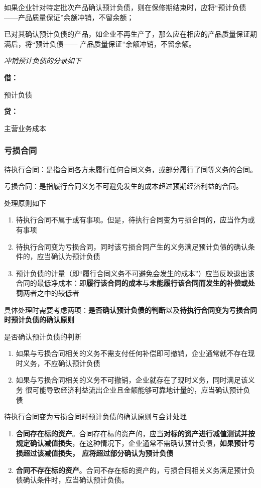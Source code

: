 \documentclass[UTF8,12pt]{ctexart}
\newenvironment{Dr}{%
	\begin{list}{}%
		{
			\setlength{\leftmargin}{2em}
			\setlength{\labelwidth}{2em}
			\setlength{\labelsep}{0pt}
			\setlength{\itemindent}{0pt}
			\setlength{\listparindent}{0pt}
			\setlength{\parsep}{0pt}
			\setlength{\topsep}{0pt}
		}
		\item[\textbf{借：}]
	}{%
	\end{list}
}
\newenvironment{Cr}{%
	\begin{list}{}%
		{
			\setlength{\leftmargin}{2em}
			\setlength{\labelwidth}{2em}
			\setlength{\labelsep}{0pt}
			\setlength{\itemindent}{0pt}
			\setlength{\listparindent}{0pt}
			\setlength{\parsep}{0pt}
			\setlength{\topsep}{0pt}
		}
		\item[\textbf{贷：}]
	}{%
	\end{list}
}
\numberwithin{equation}{section} %
\numberwithin{figure}{section}
\numberwithin{table}{section}
\begin{document}
	如果企业针对特定批次产品确认预计负债，则在保修期结束时，应将“预计负债——产品质量保证”余额冲销，不留余额；
	
	已对其确认预计负债的产品，如企业不再生产了，那么应在相应的产品质量保证期满后，将“预计负债—— 产品质量保证”余额冲销，不留余额。
	
	\textit{冲销预计负债的分录如下}
	
	\begin{Dr}
		预计负债
	\end{Dr}
	\begin{Cr}
		主营业务成本
	\end{Cr}

	
	\subsubsection{亏损合同}
	待执行合同：是指合同各方未履行任何合同义务，或部分履行了同等义务的合同。
	
	亏损合同：是指履行合同义务不可避免发生的成本超过预期经济利益的合同。
	
	处理原则如下
	\begin{enumerate}
		\item 待执行合同不属于或有事项。但是，待执行合同变为亏损合同的，应当作为或有事项
		
		\item 待执行合同变为亏损合同，同时该亏损合同产生的义务满足预计负债的确认条件的，应当确认为预计负债
		
		\item 预计负债的计量（即“履行合同义务不可避免会发生的成本”）应当反映退出该合同的最低净成本：即\textbf{履行该合同的成本}与\textbf{未能履行该合同而发生的补偿或处罚}两者之中的较低者
	\end{enumerate}

	具体处理时需要考虑两项：\textbf{是否确认预计负债的判断}以及\textbf{待执行合同变为亏损合同时预计负债的确认原则}
	
	是否确认预计负债的判断
	\begin{enumerate}
		\item 如果与亏损合同相关的义务不需支付任何补偿即可撤销，企业通常就不存在现时义务，不应确认预计负债
		
		\item 如果与亏损合同相关的义务不可撤销，企业就存在了现时义务，同时满足该义务  很可能导致经济利益流出企业且金额能够可靠地计量的，应当确认预计负债
	\end{enumerate}
	
	待执行合同变为亏损合同时预计负债的确认原则与会计处理
	\begin{enumerate}
		\item \textbf{合同存在标的资产}。合同存在标的资产的，应当\textbf{对标的资产进行减值测试并按规定确认减值损失}，在这种情况下，企业通常不需确认预计负债，\textbf{如果预计亏损超过该减值损失，  应将超过部分确认为预计负债}
		
		\item \textbf{合同不存在标的资产}。合同不存在标的资产的，亏损合同相关义务满足预计负债确认条件时，应当确认预计负债。
	\end{enumerate}
	
\end{document}
